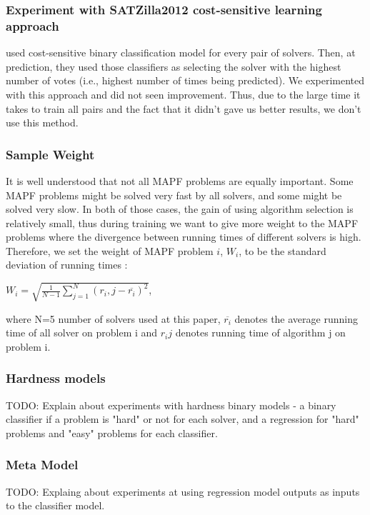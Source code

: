 \documentclass[letterpaper]{article} %
\begin{document}
\subsubsection{Experiment with SATZilla2012 cost-sensitive learning approach}
\cite{xu2012satzilla2012} used cost-sensitive binary classification model for every pair of solvers. Then, at prediction, they used those classifiers as selecting the solver with the highest number of votes (i.e., highest number of times being predicted). We experimented with this approach and did not seen improvement. Thus, due to the large time it takes to train all pairs and the fact that it didn't gave us better results, we don't use this method.

\subsubsection{Sample Weight}
It is well understood that not all MAPF problems are equally important. Some MAPF problems might be solved very fast by all solvers, and some might be solved very slow. In both of those cases, the gain of using algorithm selection is relatively small, thus during training we want to give more weight to the MAPF problems where the divergence between running times of different solvers is high. Therefore, we set the weight of MAPF problem $i$, $W_i$, to be the standard deviation of running times :

$W_i =  \sqrt{\frac{1}{N-1} \sum_{j=1}^N (r_i,j - \overline{r_i})^2}$,

where N=5 number of solvers used at this paper, $\overline{r_i}$ denotes the average running time of all solver on problem i and $r_ij$ denotes running time of algorithm j on problem i.


\subsubsection{Hardness models}
TODO: Explain about experiments with hardness binary models - a binary classifier if a problem is "hard" or not for each solver, and a regression for "hard" problems and "easy" problems for each classifier.

\subsubsection{Meta Model}
TODO: Explaing about experiments at using regression model outputs as inputs to the classifier model.
\end{document}
